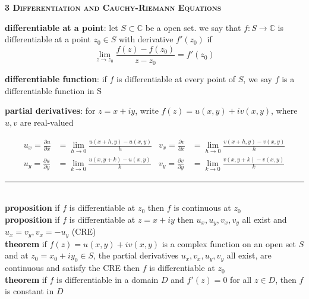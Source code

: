 \documentclass[a4paper]{article}
\newcommand*\linesep[0]{\noindent\rule{\textwidth}{0.5pt}\\}
\newcommand*\partialfrac[2]{\frac{\partial #1}{\partial #2}}
\begin{document}
\begin{framed}
	\begin{center}
		\textbf{\textsc{3 Differentiation and Cauchy-Riemann Equations}}
	\end{center}
	\textbf{differentiable at a point}: let $S \subset \mathbb{C}$ be a open set. we say that $f: S \rightarrow \mathbb{C}$ is differentiable at a point $z_0 \in S$ with derivative $f'(z_0)$ if
	$$\lim_{z \rightarrow z_0}\frac{f(z) - f(z_0)}{z - z_0} = f'(z_0)$$

	\noindent
	\textbf{differentiable function}: if $f$ is differentiable at every point of $S$, we say $f$ is a differentiable function in S
	
	\noindent
	\textbf{partial derivatives}: for $z = x + iy$, write $f(z) = u(x, y) + iv(x, y)$, where $u, v$ are real-valued
	
	\begin{align*}
  		u_x = \partialfrac{u}{x} &= \lim_{h \rightarrow 0}\frac{u(x + h, y) - u(x, y)}{h} & v_x = \partialfrac{v}{x} &= \lim_{h \rightarrow 0}\frac{v(x + h, y) - v(x, y)}{h}\\
     	u_ y = \partialfrac{u}{y} &= \lim_{k \rightarrow 0}\frac{u(x, y + k) - u(x, y)}{k} & v_y = \partialfrac{v}{y} &= \lim_{k \rightarrow 0}\frac{v(x, y + k) - v(x, y)}{k}
	\end{align*}
	
	\linesep
	
	\noindent
	\textbf{proposition} if $f$ is differentiable at $z_0$ then $f$ is continuous at $z_0$\\
	
	\noindent
	\textbf{proposition} if $f$ is differentiable at $z = x + iy$ then $u_x, u_y, v_x, v_y$ all exist and $u_x = v_y, v_x = -u_y$ (CRE)\\
	
	\noindent
	\textbf{theorem} if $f(z) = u(x, y) + iv(x, y)$ is a complex function on an open set $S$ and at $z_0 = x_0 + iy_0 \in S$, the partial derivatives $u_x, v_x, u_y, v_y$ all exist, are continuous and satisfy the CRE then $f$ is differentiable at $z_0$\\
	
	\noindent
	\textbf{theorem} if $f$ is differentiable in a domain $D$ and $f'(z) = 0$ for all $z \in D$, then $f$ is constant in $D$
\end{framed}
\end{document}
